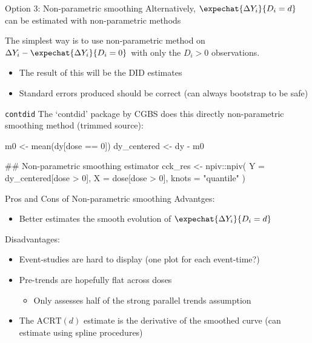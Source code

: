 \documentclass[aspectratio=169,t]{beamer}
\begin{document}
\begin{frame}{Option 3: Non-parametric smoothing}
  Alternatively, $\expechat{\Delta Y_i}{D_i = d}$ can be estimated with non-parametric methods

  \bigskip
  The simplest way is to use non-parametric method on $\Delta Y_i - \expechat{\Delta Y_i}{D_i = 0}$ with only the $D_i > 0$ observations.
  \begin{itemize}
    \item The result of this will be the DID estimates

    \item Standard errors produced should be correct (can always bootstrap to be safe)
  \end{itemize}
\end{frame}


\begin{frame}[fragile]{\texttt{contdid}}
  The `contdid' package by CGBS does this directly non-parametric smoothing method (trimmed source):

  \begin{codeblock}
m0 <- mean(dy[dose == 0])
dy_centered <- dy - m0

## Non-parametric smoothing estimator
cck_res <- npiv::npiv(
  Y = dy_centered[dose > 0],
  X = dose[dose > 0],
  knots = "quantile"
)
  \end{codeblock}
\end{frame}

\begin{frame}{Pros and Cons of Non-parametric smoothing}
  Advantges:
  \begin{itemize}
    \item Better estimates the smooth evolution of $\expechat{\Delta Y_i}{D_i = d}$
  \end{itemize}

  \bigskip
  Disadvantages:
  \begin{itemize}
    \item Event-studies are hard to display (one plot for each event-time?)
    
    \item Pre-trends are hopefully flat across doses 
    \begin{itemize}
      \item Only assesses half of the strong parallel trends assumption
    \end{itemize}

    \item The $\text{ACRT}(d)$ estimate is the derivative of the smoothed curve (can estimate using spline procedures)
  \end{itemize}
\end{frame}
\end{document}

